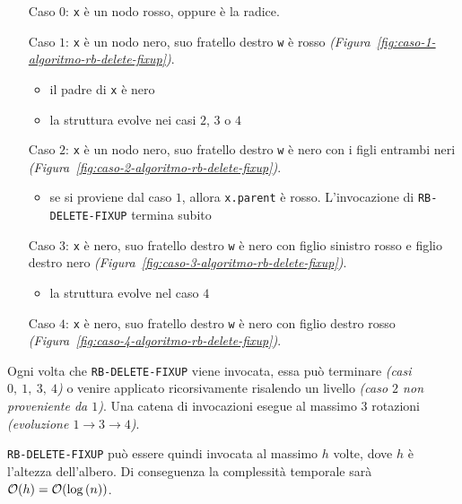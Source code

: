 \documentclass[italian, 10pt]{article}
\begin{document}
\begin{itemize}
  \item[Caso \(0\):] \texttt{x} è un nodo rosso, oppure è la radice.
  \item[Caso \(1\):] \texttt{x} è un nodo nero, suo fratello destro \texttt{w} è rosso \textit{(Figura~\ref{fig:caso-1-algoritmo-rb-delete-fixup})}.
    \begin{itemize}
      \item il padre di \texttt{x} è nero
      \item la struttura evolve nei casi \(2\), \(3\) o \(4\)
    \end{itemize}
  \item[Caso \(2\):] \texttt{x} è un nodo nero, suo fratello destro \texttt{w} è nero con i figli entrambi neri \textit{(Figura~\ref{fig:caso-2-algoritmo-rb-delete-fixup})}.
    \begin{itemize}
      \item se si proviene dal caso \(1\), allora \texttt{x.parent} è rosso. L'invocazione di \texttt{RB-DELETE-FIXUP} termina subito
    \end{itemize}
  \item[Caso \(3\):] \texttt{x} è nero, suo fratello destro \texttt{w} è nero con figlio sinistro rosso e figlio destro nero \textit{(Figura~\ref{fig:caso-3-algoritmo-rb-delete-fixup})}.
    \begin{itemize}
      \item la struttura evolve nel caso \(4\)
    \end{itemize}
  \item[Caso \(4\):] \texttt{x} è nero, suo fratello destro \texttt{w} è nero con figlio destro rosso \textit{(Figura~\ref{fig:caso-4-algoritmo-rb-delete-fixup})}.
\end{itemize}

Ogni volta che \texttt{RB-DELETE-FIXUP} viene invocata, essa può terminare \textit{(casi \(0,\ 1,\ 3,\ 4\))} o venire applicato ricorsivamente risalendo un livello \textit{(caso \(2\) non proveniente da \(1\))}.
Una catena di invocazioni esegue al massimo \(3\) rotazioni \textit{(evoluzione \(1 \rightarrow 3 \rightarrow 4\))}.

\texttt{RB-DELETE-FIXUP} può essere quindi invocata al massimo \(h\) volte, dove \(h\) è l'altezza dell'albero.
Di conseguenza la complessità temporale sarà \(\mathcal{O}(h) = \mathcal{O}(\log{(n)})\).
\end{document}
